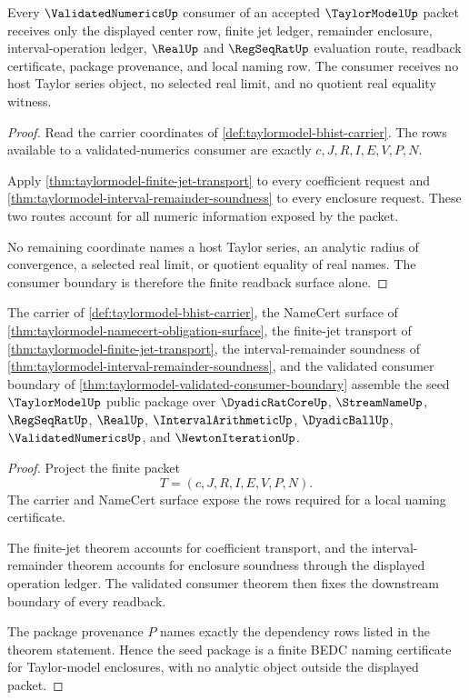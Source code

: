 \begin{theorem}
\label{thm:taylormodel-validated-consumer-boundary}
Every $\ValidatedNumericsUp$ consumer of an accepted $\TaylorModelUp$ packet receives only the displayed center row, finite jet ledger, remainder enclosure, interval-operation ledger, $\RealUp$ and $\RegSeqRatUp$ evaluation route, readback certificate, package provenance, and local naming row. The consumer receives no host Taylor series object, no selected real limit, and no quotient real equality witness.
\end{theorem}
\begin{proof}
Read the carrier coordinates of \autoref{def:taylormodel-bhist-carrier}. The rows available to a validated-numerics consumer are exactly $c,J,R,I,E,V,P,N$.

Apply \autoref{thm:taylormodel-finite-jet-transport} to every coefficient request and \autoref{thm:taylormodel-interval-remainder-soundness} to every enclosure request. These two routes account for all numeric information exposed by the packet.

No remaining coordinate names a host Taylor series, an analytic radius of convergence, a selected real limit, or quotient equality of real names. The consumer boundary is therefore the finite readback surface alone.
\end{proof}

\begin{theorem}
\label{thm:taylormodel-seed-public-package}
The carrier of \autoref{def:taylormodel-bhist-carrier}, the NameCert surface of \autoref{thm:taylormodel-namecert-obligation-surface}, the finite-jet transport of \autoref{thm:taylormodel-finite-jet-transport}, the interval-remainder soundness of \autoref{thm:taylormodel-interval-remainder-soundness}, and the validated consumer boundary of \autoref{thm:taylormodel-validated-consumer-boundary} assemble the seed $\TaylorModelUp$ public package over $\DyadicRatCoreUp$, $\StreamNameUp$, $\RegSeqRatUp$, $\RealUp$, $\IntervalArithmeticUp$, $\DyadicBallUp$, $\ValidatedNumericsUp$, and $\NewtonIterationUp$.
\end{theorem}
\begin{proof}
Project the finite packet
$$
T=(c,J,R,I,E,V,P,N).
$$
The carrier and NameCert surface expose the rows required for a local naming certificate.

The finite-jet theorem accounts for coefficient transport, and the interval-remainder theorem accounts for enclosure soundness through the displayed operation ledger. The validated consumer theorem then fixes the downstream boundary of every readback.

The package provenance $P$ names exactly the dependency rows listed in the theorem statement. Hence the seed package is a finite BEDC naming certificate for Taylor-model enclosures, with no analytic object outside the displayed packet.
\end{proof}

